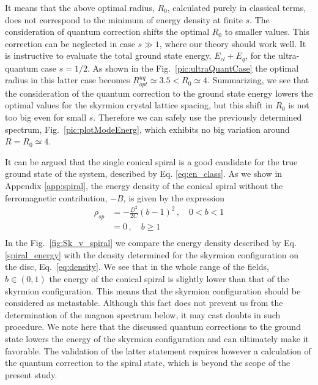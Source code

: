 \documentclass[aps,prb,twocolumn,superscriptaddress,nobalancelastpage]{revtex4-1}
\begin{document}
It means that the above optimal radius, $R_{0}$, calculated purely in classical terms, does not correspond to the minimum of energy density at finite $s$. The consideration of quantum correction shifts the optimal $R_{0}$ to smaller values.  This correction can be neglected in case $s \gg 1$, where our theory should work well.    
It is instructive to evaluate the total ground state energy, $E_{cl} + E_{q}$, for the  ultra-quantum case $s=1/2$. 
As shown in the Fig.\ \ref{pic:ultraQuantCase} the optimal radius in this latter case becomes $R^{uq}_{opt} \simeq 3.5 < R_{0} \simeq 4$. Summarizing, we see that the consideration of the quantum correction to the ground state energy  lowers the optimal values for the skyrmion crystal lattice spacing, but this shift in $R_{0}$ is not too big even for small $s$. Therefore we can safely use the previously determined spectrum, Fig.\ \ref{pic:plotModeEnerg}, which exhibits no big variation around $R=R_{0}\simeq 4$. 


It can be argued \cite{Maleyev2006} that the single conical spiral is a good candidate for the true ground state of the  system, described by Eq.  \eqref{eq:en_class}. As we show in Appendix  \ref{app:spiral}, the energy density of the conical spiral without the ferromagnetic  contribution, $-B$, is given by the expression 
 \begin{equation}
\begin{aligned}
\rho_{sp} & = - \frac{D^{2}}{2C} (b-1)^{2} \,, \quad  0<b<1   \\
 &= 0   \,, \quad  b \ge1  \\
\end{aligned}
\label{spiral_energy}
\end{equation}
In the Fig.\ \ref{fig:Sk_v_spiral} we compare the energy density 
described by Eq. \eqref{spiral_energy} with the density determined for the skyrmion configuration on the disc, Eq.\ \eqref{eq:density}. We see that in the whole range of the fields, $b\in (0,1)$ the energy of the conical spiral is slightly lower than that of the skyrmion configuration. This means that the skyrmion configuration should be considered as metastable.  Although this fact does not prevent us from the determination of the magnon spectrum below, it may cast doubts in such procedure. We   note here that the discussed quantum corrections to the ground state   lowers the energy of the skyrmion configuration and can ultimately make it favorable. The validation of the latter statement requires however a calculation of the quantum correction to the spiral state, which is beyond the scope of the present study. 
\end{document}
